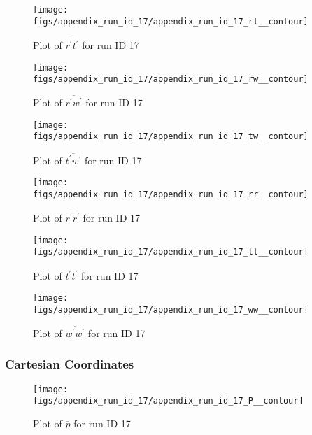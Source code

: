 \begin{figure}[H]
\centering
\texttt{[image: figs/appendix\_run\_id\_17/appendix\_run\_id\_17\_rt\_\_contour]}
\caption{Plot of $\overline{r^\prime t^\prime}$ for run ID 17}
\label{fig:appendix_run_id_17_rt__contour}
\end{figure}


\begin{figure}[H]
\centering
\texttt{[image: figs/appendix\_run\_id\_17/appendix\_run\_id\_17\_rw\_\_contour]}
\caption{Plot of $\overline{r^\prime w^\prime}$ for run ID 17}
\label{fig:appendix_run_id_17_rw__contour}
\end{figure}


\begin{figure}[H]
\centering
\texttt{[image: figs/appendix\_run\_id\_17/appendix\_run\_id\_17\_tw\_\_contour]}
\caption{Plot of $\overline{t^\prime w^\prime}$ for run ID 17}
\label{fig:appendix_run_id_17_tw__contour}
\end{figure}


\begin{figure}[H]
\centering
\texttt{[image: figs/appendix\_run\_id\_17/appendix\_run\_id\_17\_rr\_\_contour]}
\caption{Plot of $\overline{r^\prime r^\prime}$ for run ID 17}
\label{fig:appendix_run_id_17_rr__contour}
\end{figure}


\begin{figure}[H]
\centering
\texttt{[image: figs/appendix\_run\_id\_17/appendix\_run\_id\_17\_tt\_\_contour]}
\caption{Plot of $\overline{t^\prime t^\prime}$ for run ID 17}
\label{fig:appendix_run_id_17_tt__contour}
\end{figure}


\begin{figure}[H]
\centering
\texttt{[image: figs/appendix\_run\_id\_17/appendix\_run\_id\_17\_ww\_\_contour]}
\caption{Plot of $\overline{w^\prime w^\prime}$ for run ID 17}
\label{fig:appendix_run_id_17_ww__contour}
\end{figure}


\subsubsection{Cartesian Coordinates}
\begin{figure}[H]
\centering
\texttt{[image: figs/appendix\_run\_id\_17/appendix\_run\_id\_17\_P\_\_contour]}
\caption{Plot of $\overline{p}$ for run ID 17}
\label{fig:appendix_run_id_17_P__contour}
\end{figure}


